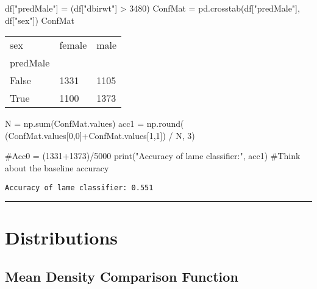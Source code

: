 \documentclass[
  letterpaper,
  DIV=11,
  numbers=noendperiod]{scrreprt}
\newenvironment{Shaded}{\begin{snugshade}}{\end{snugshade}}
\newcommand{\BuiltInTok}[1]{\textcolor[rgb]{0.00,0.23,0.31}{#1}}
\newcommand{\CommentTok}[1]{\textcolor[rgb]{0.37,0.37,0.37}{#1}}
\newcommand{\DecValTok}[1]{\textcolor[rgb]{0.68,0.00,0.00}{#1}}
\newcommand{\NormalTok}[1]{\textcolor[rgb]{0.00,0.23,0.31}{#1}}
\newcommand{\OperatorTok}[1]{\textcolor[rgb]{0.37,0.37,0.37}{#1}}
\newcommand{\StringTok}[1]{\textcolor[rgb]{0.13,0.47,0.30}{#1}}
\begin{document}
\begin{Shaded}
\begin{Highlighting}[]
\NormalTok{df[}\StringTok{"predMale"}\NormalTok{] }\OperatorTok{=}\NormalTok{ (df[}\StringTok{"dbirwt"}\NormalTok{] }\OperatorTok{\textgreater{}} \DecValTok{3480}\NormalTok{)}
\NormalTok{ConfMat }\OperatorTok{=}\NormalTok{ pd.crosstab(df[}\StringTok{"predMale"}\NormalTok{], df[}\StringTok{"sex"}\NormalTok{])}
\NormalTok{ConfMat}
\end{Highlighting}
\end{Shaded}

\begin{longtable}[]{@{}lll@{}}
\toprule()
sex & female & male \\
predMale & & \\
\midrule()
\endhead
False & 1331 & 1105 \\
True & 1100 & 1373 \\
\bottomrule()
\end{longtable}

\begin{Shaded}
\begin{Highlighting}[]
\NormalTok{N }\OperatorTok{=}\NormalTok{ np.}\BuiltInTok{sum}\NormalTok{(ConfMat.values)}
\NormalTok{acc1 }\OperatorTok{=}\NormalTok{ np.}\BuiltInTok{round}\NormalTok{( (ConfMat.values[}\DecValTok{0}\NormalTok{,}\DecValTok{0}\NormalTok{]}\OperatorTok{+}\NormalTok{ConfMat.values[}\DecValTok{1}\NormalTok{,}\DecValTok{1}\NormalTok{]) }\OperatorTok{/}\NormalTok{ N, }\DecValTok{3}\NormalTok{)}

\CommentTok{\#Acc0 = (1331+1373)/5000}
\BuiltInTok{print}\NormalTok{(}\StringTok{"Accuracy of lame classifier:"}\NormalTok{, acc1)}
\CommentTok{\#Think about the baseline accuracy}
\end{Highlighting}
\end{Shaded}

\begin{verbatim}
Accuracy of lame classifier: 0.551
\end{verbatim}

\begin{center}\rule{0.5\linewidth}{0.5pt}\end{center}

\hypertarget{distributions}{%
\section{Distributions}\label{distributions}}

\hypertarget{mean-density-comparison-function}{%
\subsection{Mean Density Comparison
Function}\label{mean-density-comparison-function}}
\end{document}

